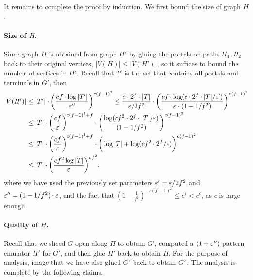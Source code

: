 It remains to complete the proof by induction. We first bound the size of graph $H$.
 
\paragraph{Size of $H$.} Since graph $H$ is obtained from graph $H'$ by gluing the portals on paths $\Pi_1,\Pi_2$ back to their original vertices, $|V(H)|\le |V(H')|$, so it suffices to bound the number of vertices in $H'$.
Recall that $T'$ is the set that contains all portals and terminals in $G'$, then
%
\[
\begin{split}
|V(H')| &
\le |T'|\cdot \bigg(\frac{cf\cdot \log |T'|}{{\varepsilon}''}\bigg)^{c(f-1)^2}
\le \frac{c\cdot 2^f\cdot |T|}{{\varepsilon}/2f^2}\cdot \bigg(\frac{cf\cdot \log (c\cdot 2^f\cdot |T|/{\varepsilon}')}{{\varepsilon}\cdot (1-1/f^2)}\bigg)^{c(f-1)^2}\\
&  \le |T|\cdot \bigg(\frac{cf}{{\varepsilon}}\bigg)^{c(f-1)^2+f}\cdot \bigg(\frac{\log (cf^2\cdot 2^f\cdot |T|/{\varepsilon})}{(1-1/f^2)}\bigg)^{c(f-1)^2}\\
& \le |T|\cdot \bigg(\frac{cf}{{\varepsilon}}\bigg)^{c(f-1)^2+f}\cdot \bigg(\log |T|+ \log (cf^2\cdot 2^f/{\varepsilon})\bigg)^{c(f-1)^2}\\
& \le |T|\cdot \bigg(\frac{cf^2 \log |T|}{{\varepsilon}}\bigg)^{cf^2},
\end{split}
\]
where we have used the previously set parameters ${\varepsilon}'={\varepsilon}/2f^2$ and ${\varepsilon}''=(1-1/f^2)\cdot {\varepsilon}$, and the fact that $(1-\frac{1}{f^2})^{-c(f-1)^2}\le e^{c}< c^{c}$, as $c$ is large enough.



\paragraph{Quality of $H$.}
Recall that we sliced $G$ open along $\Pi$ to obtain $G'$, computed a $(1+{\varepsilon}'')$ pattern emulator $H'$ for $G'$, and then glue $H'$ back to obtain $H$.
For the purpose of analysis, image that we have also glued $G'$ back to obtain $G''$. The analysis is complete by the following claims.



